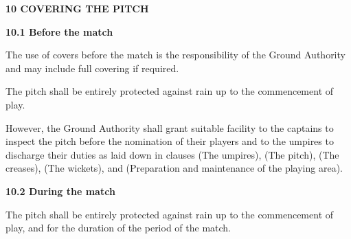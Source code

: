 \documentclass[12pt]{article}
\begin{document}
\vspace{\baselineskip}
{\fontsize{16pt}{19.2pt}\selectfont \textbf{10 COVERING THE PITCH}\par}\par


\vspace{\baselineskip}
{\fontsize{11pt}{13.2pt}\selectfont \textbf{10.1 \tabto{0.47in} Before the match}\par}\par


\vspace{\baselineskip}
\begin{adjustwidth}{0.0in}{0.38in}
{\fontsize{9pt}{10.8pt}\selectfont The use of covers before the match is the responsibility of the Ground Authority and may include full covering if required.\par}\par

\end{adjustwidth}


\vspace{\baselineskip}
{\fontsize{9pt}{10.8pt}\selectfont The pitch shall be entirely protected against rain up to the commencement of play.\par}\par


\vspace{\baselineskip}
\begin{adjustwidth}{0.0in}{0.01in}
{\fontsize{9pt}{10.8pt}\selectfont However, the Ground Authority shall grant suitable facility to the captains to inspect the pitch before the nomination of their players and to the umpires to discharge their duties as laid down in clauses (The umpires), (The pitch),  (The creases), (The wickets), and (Preparation and maintenance of the playing area).\par}\par

\end{adjustwidth}


\vspace{\baselineskip}
{\fontsize{11pt}{13.2pt}\selectfont \textbf{10.2 \tabto{0.47in} During the match}\par}\par


\vspace{\baselineskip}
\begin{adjustwidth}{0.0in}{0.11in}
{\fontsize{9pt}{10.8pt}\selectfont The pitch shall be entirely protected against rain up to the commencement of play, and for the duration of the period of the match.\par}\par

\end{adjustwidth}
\end{document}
